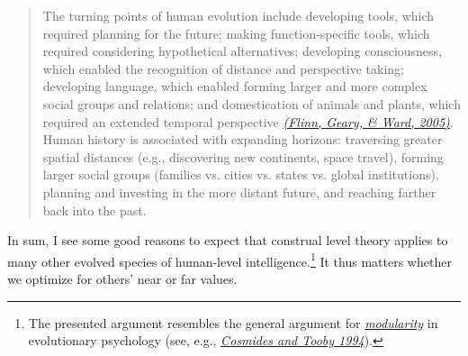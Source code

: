 \begin{quote}
The turning points of human evolution include developing tools, which
required planning for the future; making function-specific tools, which
required considering hypothetical alternatives; developing
consciousness, which enabled the recognition of distance and perspective
taking; developing language, which enabled forming larger and more
complex social groups and relations; and domestication of animals and
plants, which required an extended temporal perspective
\href{http://web.missouri.edu/~gearyd/Flinnetal2005.pdf}{\emph{(Flinn,
Geary, \& Ward, 2005)}}. Human history is associated with expanding
horizons: traversing greater spatial distances (e.g., discovering new
continents, space travel), forming larger social groups (families vs.
cities vs. states vs. global institutions), planning and investing in
the more distant future, and reaching farther back into the past.
\end{quote}

In sum, I see some good reasons to expect that construal level theory
applies to many other evolved species of human-level
intelligence.\footnote{The presented argument resembles the general
  argument for
  \href{https://en.wikipedia.org/wiki/Modularity_of_mind}{\emph{modularity}}
  in evolutionary psychology (see, e.g.,
  \href{http://citeseerx.ist.psu.edu/viewdoc/download?doi=10.1.1.140.7758\&rep=rep1\&type=pdf}{\emph{Cosmides
  and Tooby 1994}}).} It thus matters whether we optimize for others'
near or far values.

